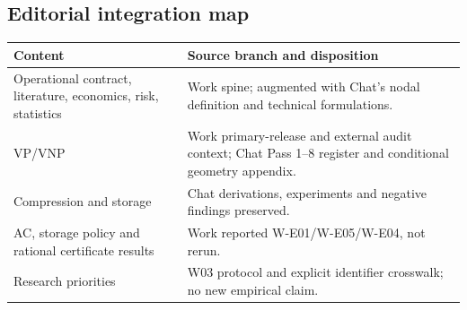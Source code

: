 \documentclass[11pt,letterpaper]{article}
\begin{document}
\subsection{Editorial integration map}
\begin{longtable}{P{.38\linewidth}P{.53\linewidth}}
\toprule Content & Source branch and disposition\\\midrule\endhead
Operational contract, literature, economics, risk, statistics & Work spine; augmented with Chat's nodal definition and technical formulations.\\
VP/VNP & Work primary-release and external audit context; Chat Pass 1--8 register and conditional geometry appendix.\\
Compression and storage & Chat derivations, experiments and negative findings preserved.\\
AC, storage policy and rational certificate results & Work reported W-E01/W-E05/W-E04, not rerun.\\
Research priorities & W03 protocol and explicit identifier crosswalk; no new empirical claim.\\
\bottomrule
\end{longtable}
\end{document}
